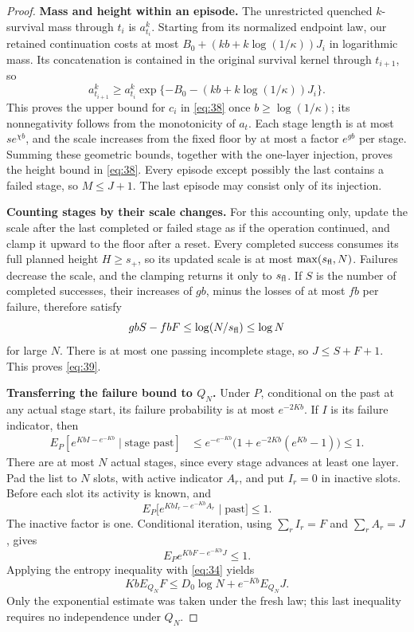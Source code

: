 \begin{proof}
\smallskip\noindent\textbf{Mass and height within an episode.}
The unrestricted quenched \(k\)-survival mass through \(t_i\) is
\(a_{t_i}^k\). Starting from its normalized endpoint law, our retained
continuation costs at most
\(B_0+(kb+k\log(1/\kappa))J_i\) in logarithmic mass. Its
concatenation is contained in the original survival kernel through
\(t_{i+1}\), so
\[
 a_{t_{i+1}}^k\ge a_{t_i}^k
 \exp\{-B_0-(kb+k\log(1/\kappa))J_i\}.
\]
This proves the upper bound for \(c_i\) in \eqref{eq:38} once
\(b\ge\log(1/\kappa)\); its nonnegativity follows from the
monotonicity of \(a_t\). Each stage length is at most
\(se^{\chi b}\), and the scale increases from the fixed floor by
at most a factor \(e^{gb}\) per stage. Summing these geometric
bounds, together with the one-layer injection, proves the height bound
in \eqref{eq:38}. Every episode except possibly the last contains a
failed stage, so \(M\le J+1\). The last episode may consist only of
its injection.

\smallskip\noindent\textbf{Counting stages by their scale changes.}
For this accounting only, update the scale after the last completed or
failed stage as if the operation continued, and clamp it upward to the
floor after a reset. Every completed success consumes its full planned
height \(H\ge s_+\), so its updated scale is at most
\(\max(s_{\rm fl},N)\). Failures decrease the scale, and the
clamping returns it only to \(s_{\rm fl}\). If \(S\) is the
number of completed successes, their increases of \(gb\), minus the
losses of at most \(fb\) per failure, therefore satisfy
\[
 gbS-fbF\le\log(N/s_{\rm fl})\le\log N
\]
for large \(N\). There is at most one passing incomplete stage, so
\(J\le S+F+1\). This proves \eqref{eq:39}.

\smallskip\noindent\textbf{Transferring the failure bound to \(Q_N\).}
Under \(P\), conditional on the past at any actual stage start, its
failure probability is at most \(e^{-2Kb}\). If \(I\) is its
failure indicator, then
\[
\begin{split}
 E_P[e^{KbI-e^{-Kb}}\mid\text{stage past}]
 &\le e^{-e^{-Kb}}
       \bigl(1+e^{-2Kb}(e^{Kb}-1)\bigr)\le1.
\end{split}
\]
There are at most \(N\) actual stages, since every stage advances at
least one layer. Pad the list to \(N\) slots, with active indicator
\(A_r\), and put \(I_r=0\) in inactive slots. Before each slot its
activity is known, and
\[
 E_P\big[e^{KbI_r-e^{-Kb}A_r}\mid\text{past}\big]\le1.
\]
The inactive factor is one. Conditional iteration, using
\(\sum_r I_r=F\) and \(\sum_r A_r=J\), gives
\[
 E_P e^{KbF-e^{-Kb}J}\le1.
\]
Applying the entropy inequality with \eqref{eq:34} yields
\[
 KbE_{Q_N}F\le D_0\log N+e^{-Kb}E_{Q_N}J.
\]
Only the exponential estimate was taken under the fresh law; this last
inequality requires no independence under \(Q_N\).


\end{proof}
